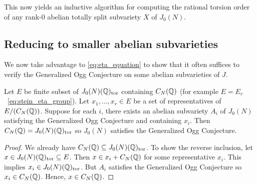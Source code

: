 This now yields an inductive algorithm for computing the rational torsion order
of any rank-0 abelian totally split subvariety $X$ of $J_0(N)$.

\subsection{Reducing to smaller abelian subvarieties}%
\label{sub:reducing_to_smaller_abelian_subvarieties}

We now take advantage to \eqref{eq:eta_equation} to show that it often suffices
to verify the Generalized Ogg Conjecture on some abelian subvarieties of $J$.
\begin{proposition}
    Let $E$ be finite subset of $J_0(N)(\mathbb{Q})_{\mathrm{tor}}$ containing $C_N(\mathbb{Q})$ (for
    example $E=E_r$~\eqref{eq:stein_eta_group}). Let $x_1,\ldots,x_r\in E$ be a
    set of representatives of $E/(C_N(\mathbb{Q}))$. Suppose for each $i$, there
    exists an abelian subvariety $A_i$ of $J_0(N)$ satisfying the Generalized
    Ogg Conjecture and containing $x_i$. Then $C_N(\mathbb{Q})=J_0(N)(\mathbb{Q})_{\mathrm{tor}}$ so
    $J_0(N)$ satisfies the Generalized Ogg Conjecture.
\end{proposition}
\begin{proof}
    We already have $C_N(\mathbb{Q})\subseteq J_0(N)(\mathbb{Q})_{\mathrm{tor}}$. To show the
    reverse inclusion, let $x\in J_0(N)(\mathbb{Q})_{\mathrm{tor}}\subseteq E$. Then $x\in
    x_i+C_N(\mathbb{Q})$ for some representative $x_i$. This implies $x_i\in
    J_0(N)(\mathbb{Q})_{\mathrm{tor}}$. But $A_i$ satisfies the Generalized Ogg Conjecture so
    $x_i\in C_N(\mathbb{Q})$. Hence, $x\in C_N(\mathbb{Q})$.
\end{proof}





